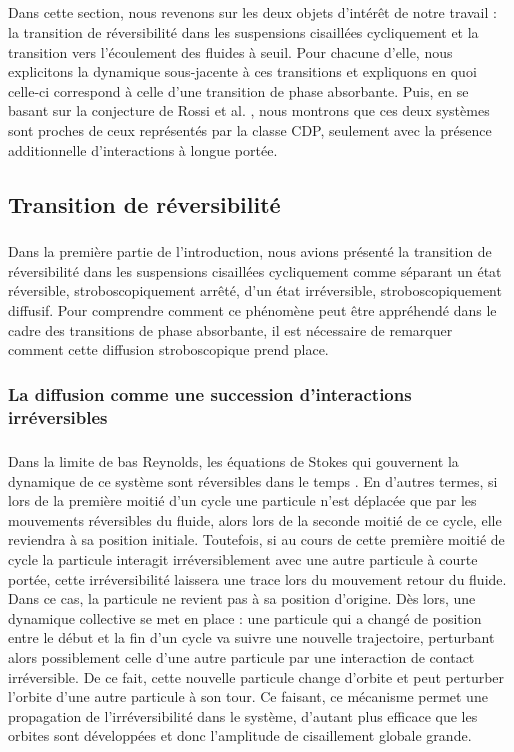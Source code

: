 \subparagraph{}Dans cette section, nous revenons sur les deux objets d'intérêt de notre travail : la transition de réversibilité dans les suspensions cisaillées cycliquement et la transition vers l'écoulement des fluides à seuil. Pour chacune d'elle, nous explicitons la dynamique sous-jacente à ces transitions et expliquons en quoi celle-ci correspond à celle d'une transition de phase absorbante. Puis, en se basant sur la conjecture de Rossi et al. \cite{rossi_universality_2000}, nous montrons que ces deux systèmes sont proches de ceux représentés par la classe CDP, seulement avec la présence additionnelle d'interactions à longue portée.

\subsection{Transition de réversibilité}

\subparagraph{}Dans la première partie de l'introduction, nous avions présenté la transition de réversibilité dans les suspensions cisaillées cycliquement comme séparant un état réversible, stroboscopiquement arrêté, d'un état irréversible, stroboscopiquement diffusif. Pour comprendre comment ce phénomène peut être appréhendé dans le cadre des transitions de phase absorbante, il est nécessaire de remarquer comment cette diffusion stroboscopique prend place.

\subsubsection{La diffusion comme une succession d'interactions irréversibles}


\subparagraph{}Dans la limite de bas Reynolds, les équations de Stokes qui gouvernent la dynamique de ce système sont réversibles dans le temps \cite{kimMicrohydrodynamicsPrinciplesSelected1991}. En d'autres termes, si lors de la première moitié d'un cycle une particule n'est déplacée que par les mouvements réversibles du fluide, alors lors de la seconde moitié de ce cycle, elle reviendra à sa position initiale. Toutefois, si au cours de cette première moitié de cycle la particule interagit irréversiblement avec une autre particule à courte portée, cette irréversibilité laissera une trace lors du mouvement retour du fluide. Dans ce cas, la particule ne revient pas à sa position d'origine. Dès lors, une dynamique collective se met en place : une particule qui a changé de position entre le début et la fin d'un cycle va suivre une nouvelle trajectoire, perturbant alors possiblement celle d'une autre particule par une interaction de contact irréversible. De ce fait, cette nouvelle particule change d'orbite et peut perturber l'orbite d'une autre particule à son tour. Ce faisant, ce mécanisme permet une propagation de l'irréversibilité dans le système, d'autant plus efficace que les orbites sont développées et donc l'amplitude de cisaillement globale grande.

